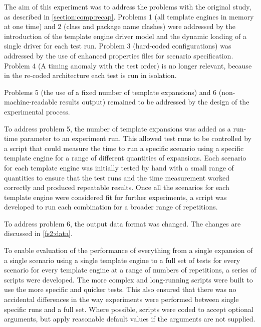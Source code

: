 The aim of this experiment was to address the problems with the original study, as described in \autoref{section:comp:recap}. Problems 1 (all \gls{template engine}s in memory at one time) and 2 (class and package name clashes) were addressed by the introduction of the \gls{template engine} driver model and the dynamic loading of a single driver for each test run. Problem 3 (hard-coded configurations) was addressed by the use of enhanced properties files for scenario specification. Problem 4 (A timing anomaly with the test order) is no longer relevant, because in the re-coded architecture each test is run in isolation.

Problems 5 (the use of a fixed number of template expansions) and 6 (non-machine-readable results output) remained to be addressed by the design of the experimental process.

To address problem 5, the number of template expansions was added as a run-time parameter to an experiment run. This allowed test runs to be controlled by a script that could measure the time to run a specific scenario using a specific \gls{template engine} for a range of different quantities of expansions. Each scenario for each \gls{template engine} was initially tested by hand with a small range of quantities to ensure that the test runs and the time measurement worked correctly and produced repeatable results. Once all the scenarios for each \gls{template engine} were considered fit for further experiments, a script was developed to run each combination for a broader range of repetitions.

To address problem 6, the output data format was changed. The changes are discussed in \autoref{fs2:data}.

To enable evaluation of the performance of everything from a single expansion of a single scenario using a single \gls{template engine} to a full set of tests for every scenario for every \gls{template engine} at a range of numbers of repetitions, a series of scripts were developed. The more complex and long-running scripts were built to use the more specific and quicker tests. This also ensured that there was no accidental differences in the way experiments were performed between single specific runs and a full set. Where possible, scripts were coded to accept optional arguments, but apply reasonable default values if the arguments are not supplied.

